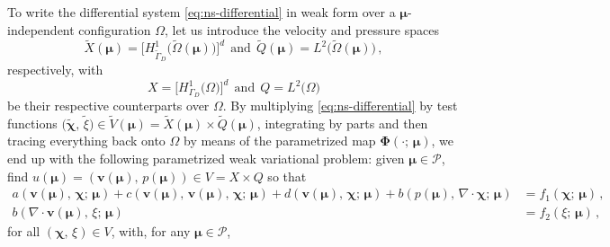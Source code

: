 \documentclass[longtitle]{elsarticle}
\numberwithin{equation}{section}
\theoremstyle{theorem}
\theoremstyle{definition}
\theoremstyle{remark}
\theoremstyle{proposition}
\numberwithin{figure}{section}
\newcommand{\wt}[1]{\widetilde{#1}}
\newcommand{\bg}[1]{\boldsymbol{#1}}
\begin{document}
		To write the differential system \eqref{eq:ns-differential} in weak form over a $\bg{\mu}$-independent configuration $\Omega$, let us introduce the velocity and pressure spaces \[ \wt{X}(\bg{\mu}) = \big[ H^1_{\wt{\Gamma}_D} \big( \wt{\Omega}(\bg{\mu}) \big) \big]^d ~~ \text{and} ~~ \wt{Q}(\bg{\mu}) = L^2 \big( \wt{\Omega}(\bg{\mu}) \big) \, , \] respectively, with \[ X = \big[ H^1_{\Gamma_D} \big( \Omega \big) \big]^d ~~ \text{and} ~~ Q = L^2 \big( \Omega \big) \] be their respective counterparts over $\Omega$. By multiplying \eqref{eq:ns-differential} by test functions $\big( \wt{\bg{\chi}}, \, \wt{\xi} \big) \in \wt{V}(\bg{\mu}) = \wt{X}(\bg{\mu}) \times \wt{Q}(\bg{\mu})$, integrating by parts and then tracing everything back onto $\Omega$ by means of the parametrized map $\bg{\Phi}(\cdot; \, \bg{\mu})$, we end up with the following parametrized weak variational problem: given $\bg{\mu} \in \mathcal{P}$, find $u(\bg{\mu}) = (\bg{v}(\bg{\mu}), \, p(\bg{\mu})) \in V = X \times Q$ so that
		\vspace*{-0.1cm}
		\begin{equation*}
			\begin{aligned}
				a(\bg{v}(\bg{\mu}), \, \bg{\chi}; \, \bg{\mu}) + c(\bg{v}(\bg{\mu}), \, \bg{v}(\bg{\mu}), \, \bg{\chi}; \, \bg{\mu}) + d(\bg{v}(\bg{\mu}), \, \bg{\chi}; \, \bg{\mu}) + b(p(\bg{\mu}), \, \nabla \cdot \bg{\chi}; \, \bg{\mu}) & = f_1(\bg{\chi}; \, \bg{\mu}) \, , \\
				b(\nabla \cdot \bg{v}(\bg{\mu}), \, \xi; \, \bg{\mu}) & = f_2(\xi; \, \bg{\mu}) \, ,
			\end{aligned}
		\end{equation*}
		for all $(\bg{\chi}, \, \xi) \in V$, with, for any $\bg{\mu} \in \mathcal{P}$,	
		\vspace*{-0.1cm}	
\end{document}
